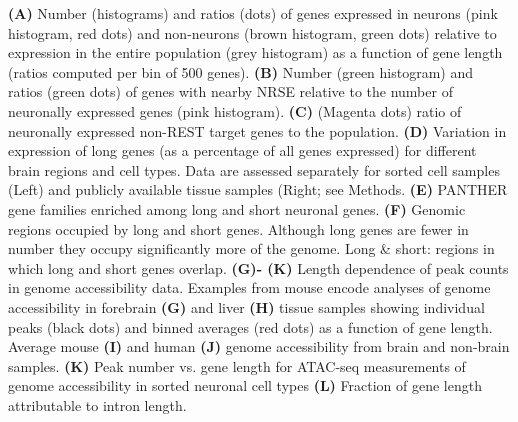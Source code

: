 \textbf{(A)} Number (histograms) and ratios (dots) of genes expressed in neurons (pink histogram, red dots) and non-neurons (brown histogram, green dots) relative to expression in the entire population (grey histogram) as a function of gene length (ratios computed per bin of 500 genes). 
\textbf{(B)} Number (green histogram) and ratios (green dots) of genes with nearby NRSE relative to the number of neuronally expressed genes (pink histogram). 
\textbf{(C)} (Magenta dots) ratio of neuronally expressed non-REST target genes to the population.
\textbf{(D)} Variation in expression of long genes (as a percentage of all genes expressed) for different brain regions and cell types. Data are assessed separately for sorted cell samples (Left) and publicly available tissue samples (Right; see Methods.
\textbf{(E)} PANTHER gene families enriched among long and short neuronal genes. 
\textbf{(F)} Genomic regions occupied by long and short genes. Although long genes are fewer in number they occupy significantly more of the genome. Long \& short: regions in which long and short genes overlap. 
\textbf{(G)- (K)} Length dependence of peak counts in genome accessibility data.
Examples from mouse encode analyses of genome accessibility in forebrain \textbf{(G)} and liver \textbf{(H)} tissue samples showing individual peaks (black dots) and binned averages (red dots) as a function of gene length. Average mouse \textbf{(I)} and human \textbf{(J)} genome accessibility from brain and non-brain samples.
\textbf{(K)} Peak number vs. gene length for ATAC-seq measurements of genome accessibility in sorted neuronal cell types
\textbf{(L)} Fraction of gene length attributable to intron length.